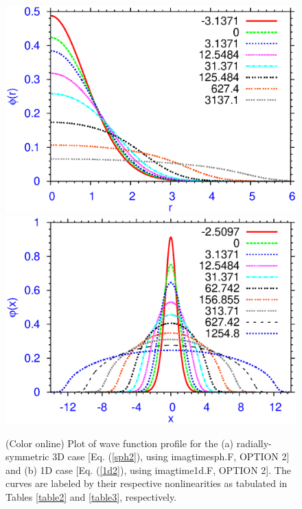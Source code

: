 \documentclass[onecolumn]{elsart3p}
\begin{document}
\begin{figure}[tbp] \begin{center}
{\includegraphics[width=.49\linewidth]{fig2a.ps}}
{\includegraphics[width=.49\linewidth]{fig2b.ps}}
\end{center}
\caption{(Color online) Plot of wave function profile for the (a)
radially-symmetric 3D case [Eq. (\ref{sph2}), using imagtimesph.F,
OPTION 2]  and (b)  1D
case [Eq. (\ref{1d2}),  using imagtime1d.F, OPTION 2].  The
curves are
labeled by their respective nonlinearities as tabulated in Tables
\ref{table2} and \ref{table3}, respectively.}
\label{fig2}
\end{figure}
\end{document}
